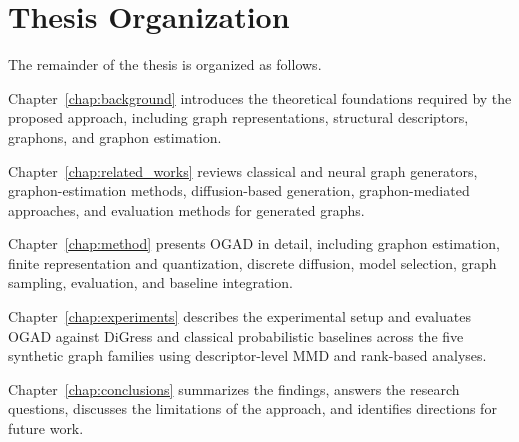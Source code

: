 \section{Thesis Organization}
\label{sec:intro_organization}

The remainder of the thesis is organized as follows.

Chapter~\ref{chap:background} introduces the theoretical foundations required by the proposed approach, including graph representations, structural descriptors, graphons, and graphon estimation.

Chapter~\ref{chap:related_works} reviews classical and neural graph generators, graphon-estimation methods, diffusion-based generation, graphon-mediated approaches, and evaluation methods for generated graphs.

Chapter~\ref{chap:method} presents OGAD in detail, including graphon estimation, finite representation and quantization, discrete diffusion, model selection, graph sampling, evaluation, and baseline integration.

Chapter~\ref{chap:experiments} describes the experimental setup and evaluates OGAD against DiGress and classical probabilistic baselines across the five synthetic graph families using descriptor-level MMD and rank-based analyses.

Chapter~\ref{chap:conclusions} summarizes the findings, answers the research questions, discusses the limitations of the approach, and identifies directions for future work.